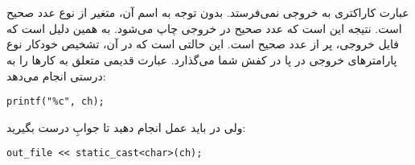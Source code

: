 \section{}
\paragraph{}\label{answer:99}
عبارت  کاراکتری به خروجی نمی‌فرستد. بدون توجه به اسم آن، متغیر  از نوع عدد صحیح است. نتیجه این است که عدد صحیح در خروجی چاپ می‌شود. به همین دلیل است که فایل خروجی، پر از عدد صحیح است. این حالتی است که در آن، تشخیص خودکار نوع پارامترهای خروجی در  پا در کفش شما می‌گذارد. عبارت قدیمی  متعلق به  کارها را به درستی انجام می‌دهد:
\begin{LTR}
    \begin{lstlisting}[style=C++Style]
        printf("%c", ch);
    \end{lstlisting}
\end{LTR}

ولی در  باید عمل  انجام دهید تا جوابِ درست بگیرید:
\begin{LTR}
    \begin{lstlisting}[style=C++Style]
        out_file << static_cast<char>(ch);
    \end{lstlisting}
\end{LTR}
